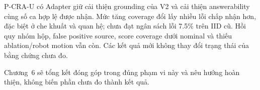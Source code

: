 P-CRA-U có Adapter giữ cải thiện grounding của V2 và cải thiện
answerability cùng số ca hợp lệ được nhận. Mức tăng coverage đổi lấy
nhiều lỗi chấp nhận hơn, đặc biệt ở che khuất và quan hệ; chưa đạt
ngân sách lỗi 7.5\% trên IID cũ. Hồi quy nhóm hộp, false positive source,
score coverage dưới nominal và thiếu ablation/robot motion vẫn còn.
Các kết quả mới không thay đổi trạng thái của bằng chứng chưa đo.

Chương~6 sẽ tổng kết đóng góp trong đúng
phạm vi này và nêu hướng hoàn thiện,
không biến phần chưa đo thành kết quả.
